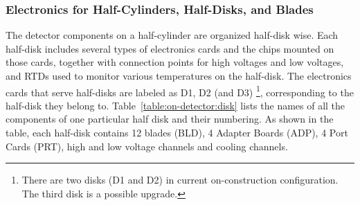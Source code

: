 \documentclass{cmspaper}
\begin{document}
\subsubsection{Electronics for Half-Cylinders, Half-Disks, and Blades}

The detector components on a half-cylinder are organized half-disk wise.
Each half-disk includes several types of electronics cards and the chips
mounted on those cards, 
together with connection points for high voltages and low voltages, 
and RTDs used to monitor various temperatures on the half-disk. 
The electronics cards that serve half-disks are labeled as D1, D2 (and D3)
\footnote{There are two disks (D1 and D2) in current on-construction configuration. 
          The third disk is a possible upgrade.}, 
corresponding to the half-disk they belong to.
Table~\ref{table:on-detector:disk} lists the names of all the components 
of one particular half disk and their numbering. 
As shown in the table, each half-disk contains 12 blades (BLD), 
4 Adapter Boards (ADP), 4 Port Cards (PRT), 
high and low voltage channels and cooling channels.
\end{document}
